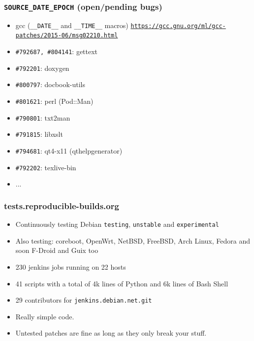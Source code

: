 \documentclass[14pt,aspectratio=169]{beamer}
\begin{document}
\begin{frame}
 \frametitle{\texttt{SOURCE\_DATE\_EPOCH} (open/pending bugs)}

 \begin{itemize}
  \item gcc (\texttt{\_\_DATE\_\_} and \texttt{\_\_TIME\_\_} macros) \texttt{\footnotesize{\url{https://gcc.gnu.org/ml/gcc-patches/2015-06/msg02210.html}}}
  \item \texttt{\#792687, \#804141}: gettext
  \item \texttt{\#792201}: doxygen
  \item \texttt{\#800797}: docbook-utils
  \item \texttt{\#801621}: perl (Pod::Man)
  \item \texttt{\#790801}: txt2man
  \item \texttt{\#791815}: libxslt
  \item \texttt{\#794681}: qt4-x11 (qthelpgenerator)
  \item \texttt{\#792202}: texlive-bin
  \item ...
 \end{itemize}

\end{frame}


\begin{frame}
 \frametitle{tests.reproducible-builds.org}

 \begin{itemize}
  \item Continuously testing Debian \texttt{testing}, \texttt{unstable} and
  \texttt{experimental}
  \item Also testing: coreboot, OpenWrt, NetBSD, FreeBSD,
  Arch Linux, Fedora and soon F-Droid and Guix too
  \item<2-3> 230 jenkins jobs running on 22 hosts
  \item<2-3> 41 scripts with a total of 4k lines of Python and 6k lines of Bash
  Shell
  \item<2-3> 29 contributors for \texttt{jenkins.debian.net.git}
  \item<3> Really simple code.
  \item<3> Untested patches are fine as long as they only break your stuff.
 \end{itemize}
\end{frame}
\end{document}
